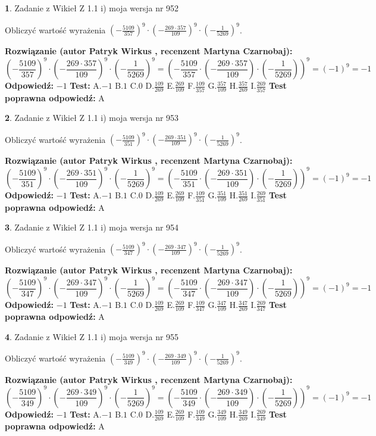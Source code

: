 \documentclass[12pt, a4paper]{article}
\theoremstyle{definition} %
\newtheorem{zad}{}
\newcommand{\zadStart}[1]{\begin{zad}#1\newline}
\newcommand{\zadStop}{\end{zad}}
\newcommand{\rozwStart}[2]{\noindent \textbf{Rozwiązanie (autor #1 , recenzent #2): }\newline}
\newcommand{\rozwStop}{\newline}
\newcommand{\odpStart}{\noindent \textbf{Odpowiedź:}\newline}
\newcommand{\odpStop}{\newline}
\newcommand{\testStart}{\noindent \textbf{Test:}\newline}
\newcommand{\testStop}{\newline}
\newcommand{\kluczStart}{\noindent \textbf{Test poprawna odpowiedź:}\newline}
\newcommand{\kluczStop}{\newline}
\begin{document}
\zadStart{Zadanie z Wikieł Z 1.1 i) moja wersja nr 952}

Obliczyć wartość wyrażenia $(-\frac{5109}{357})^{9} \cdot (-\frac{269 \cdot 357}{109})^{9} \cdot (-\frac{1}{5269})^{9}$.
\zadStop
\rozwStart{Patryk Wirkus}{Martyna Czarnobaj}
$$(-\frac{5109}{357})^{9} \cdot (-\frac{269 \cdot 357}{109})^{9} \cdot (-\frac{1}{5269})^{9} = (-\frac{5109}{357} \cdot (-\frac{269 \cdot 357}{109}) \cdot (-\frac{1}{5269}))^{9} = (-1)^{9} = -1$$
\rozwStop
\odpStart
$-1$
\odpStop
\testStart
A.$-1$ B.$1$ C.$0$ D.$\frac{109}{269}$ E.$\frac{269}{109}$
F.$\frac{109}{357}$ G.$\frac{357}{109}$
H.$\frac{357}{269}$
I.$\frac{269}{357}$
\testStop
\kluczStart
A
\kluczStop



\zadStart{Zadanie z Wikieł Z 1.1 i) moja wersja nr 953}

Obliczyć wartość wyrażenia $(-\frac{5109}{351})^{9} \cdot (-\frac{269 \cdot 351}{109})^{9} \cdot (-\frac{1}{5269})^{9}$.
\zadStop
\rozwStart{Patryk Wirkus}{Martyna Czarnobaj}
$$(-\frac{5109}{351})^{9} \cdot (-\frac{269 \cdot 351}{109})^{9} \cdot (-\frac{1}{5269})^{9} = (-\frac{5109}{351} \cdot (-\frac{269 \cdot 351}{109}) \cdot (-\frac{1}{5269}))^{9} = (-1)^{9} = -1$$
\rozwStop
\odpStart
$-1$
\odpStop
\testStart
A.$-1$ B.$1$ C.$0$ D.$\frac{109}{269}$ E.$\frac{269}{109}$
F.$\frac{109}{351}$ G.$\frac{351}{109}$
H.$\frac{351}{269}$
I.$\frac{269}{351}$
\testStop
\kluczStart
A
\kluczStop



\zadStart{Zadanie z Wikieł Z 1.1 i) moja wersja nr 954}

Obliczyć wartość wyrażenia $(-\frac{5109}{347})^{9} \cdot (-\frac{269 \cdot 347}{109})^{9} \cdot (-\frac{1}{5269})^{9}$.
\zadStop
\rozwStart{Patryk Wirkus}{Martyna Czarnobaj}
$$(-\frac{5109}{347})^{9} \cdot (-\frac{269 \cdot 347}{109})^{9} \cdot (-\frac{1}{5269})^{9} = (-\frac{5109}{347} \cdot (-\frac{269 \cdot 347}{109}) \cdot (-\frac{1}{5269}))^{9} = (-1)^{9} = -1$$
\rozwStop
\odpStart
$-1$
\odpStop
\testStart
A.$-1$ B.$1$ C.$0$ D.$\frac{109}{269}$ E.$\frac{269}{109}$
F.$\frac{109}{347}$ G.$\frac{347}{109}$
H.$\frac{347}{269}$
I.$\frac{269}{347}$
\testStop
\kluczStart
A
\kluczStop



\zadStart{Zadanie z Wikieł Z 1.1 i) moja wersja nr 955}

Obliczyć wartość wyrażenia $(-\frac{5109}{349})^{9} \cdot (-\frac{269 \cdot 349}{109})^{9} \cdot (-\frac{1}{5269})^{9}$.
\zadStop
\rozwStart{Patryk Wirkus}{Martyna Czarnobaj}
$$(-\frac{5109}{349})^{9} \cdot (-\frac{269 \cdot 349}{109})^{9} \cdot (-\frac{1}{5269})^{9} = (-\frac{5109}{349} \cdot (-\frac{269 \cdot 349}{109}) \cdot (-\frac{1}{5269}))^{9} = (-1)^{9} = -1$$
\rozwStop
\odpStart
$-1$
\odpStop
\testStart
A.$-1$ B.$1$ C.$0$ D.$\frac{109}{269}$ E.$\frac{269}{109}$
F.$\frac{109}{349}$ G.$\frac{349}{109}$
H.$\frac{349}{269}$
I.$\frac{269}{349}$
\testStop
\kluczStart
A
\kluczStop
\end{document}
